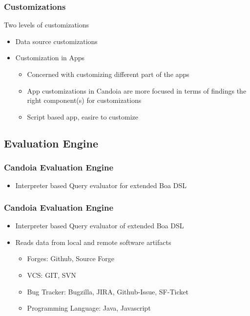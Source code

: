         \begin{frame}
        \frametitle{Customizations}
            Two levels of customizations
            \begin{itemize}
                \item Data source customizations
                \item Customization in Apps
                    \begin{itemize}
                        \item Concerned with customizing different part of the apps
                        \item App customizations in Candoia are more focused in terms of findings the right component(s) for customizations
                        \item Script based app, easire to customize
                    \end{itemize}
            \end{itemize}
        \end{frame}


    \subsection{Evaluation Engine}
        \begin{frame}
            \frametitle{Candoia Evaluation Engine}
            \begin{itemize}
                \item Interpreter based Query evaluator for extended Boa DSL
            \end{itemize}
        \end{frame}

        \begin{frame}
            \frametitle{Candoia Evaluation Engine}
            \begin{itemize}
                \item Interpreter based Query evaluator of extended Boa DSL
                \item Reads data from local and remote software artifacts
                    \begin{itemize}
                        \item Forges: Github, Source Forge
                        \item VCS: GIT, SVN
                        \item Bug Tracker: Bugzilla, JIRA, Github-Issue, SF-Ticket
                        \item Programming Language: Java, Javascript
                    \end{itemize}
                \end{itemize}
            \end{frame}



